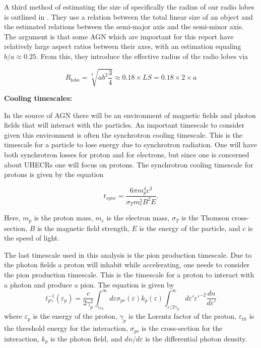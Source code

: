 A third method of estimating the size of specifically the radius of our radio lobes is outlined in \cite{W_jtowicz_2020}. They use a relation between the total linear size of an object and the estimated relations between the semi-major axis and the semi-minor axis. The argument is that some AGN which are important for this report have relatively large aspect ratios between their axes, with an estimation equaling $b/a \approx 0.25$. From this, they introduce the effective radius of the radio lobes via

\begin{equation}
    R_{\text{lobe}} = \sqrt[3]{ab^2\frac{3}{4}} \approx 0.18 \times LS = 0.18 \times 2 \times a 
\end{equation}


\textbf{Cooling timescales:}

In the source of AGN there will be an environment of magnetic fields and photon fields that will interact with the particles. An important timescale to consider given this environment is often the synchrotron cooling timescale. This is the timescale for a particle to lose energy due to synchrotron radiation. One will have both synchrotron losses for proton and for electrons, but since one is concerned about UHECRs one will focus on protons. The synchrotron cooling timescale for protons is given by the equation

\begin{equation}
    t_{sync} = \frac{6\pi m_p^4 c^3}{\sigma_T m_e^2 B^2 E}.
\end{equation}

Here, $m_p$ is the proton mass, $m_e$ is the electron mass, $\sigma_T$ is the Thomson cross-section, $B$ is the magnetic field strength, $E$ is the energy of the particle, and $c$ is the speed of light.

The last timescale used in this analysis is the pion production timescale. Due to the photon fields a proton will inhabit while accelerating, one needs to consider the pion production timescale. This is the timescale for a proton to interact with a photon and produce a pion. The equation is given by
\begin{equation}
    t_{p\gamma}^{-1}(\varepsilon_p) = \frac{c}{2\gamma_p^2} \int_{\varepsilon_{th}}^{\infty} d\varepsilon \sigma_{pr}(\varepsilon) k_p(\varepsilon) \int_{\varepsilon/2\gamma_p}^{\infty} d\varepsilon' \varepsilon'^{-2} \frac{dn}{d\varepsilon'}
\end{equation}
where $\varepsilon_p$ is the energy of the proton, $\gamma_p$ is the Lorentz factor of the proton, $\varepsilon_{th}$ is the threshold energy for the interaction, $\sigma_{pr}$ is the cross-section for the interaction, $k_p$ is the photon field, and $dn/d\varepsilon$ is the differential photon density.

